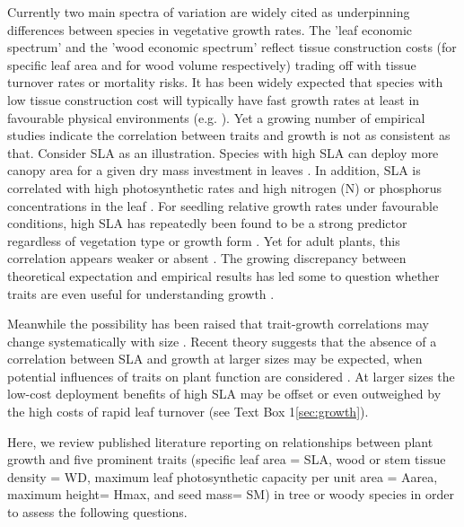 \documentclass[a4paper]{article}\usepackage[]{graphicx}\usepackage[]{color}
\begin{document}
Currently two main spectra of variation are widely cited as underpinning differences between species in vegetative growth rates. The 'leaf economic spectrum' \citep{Wright:2004jb} and the 'wood economic spectrum' \citep{Chave:2009iy} reflect tissue construction costs (for specific leaf area and for wood volume respectively) trading off with tissue turnover rates or mortality risks. It has been widely expected that species with low tissue construction cost will typically have fast growth rates at least in favourable physical environments (e.g. \citealt{MullerLandau:2004dc,Wright:2004jb,Poorter:2008iu,Chave:2009iy,Larjavaara:2010bn,Iida:2012jb,Paine:2015df}). Yet a growing number of empirical studies indicate the correlation between traits and growth is not as consistent as that. Consider SLA as an illustration. Species with high SLA can deploy more canopy area for a given dry mass investment in leaves \citep{Poorter:1999wd, Reich:1992wm}. In addition, SLA is correlated with high photosynthetic rates and high nitrogen (N) or phosphorus concentrations in the leaf \citep{Wright:2004jb}. For seedling relative growth rates under favourable conditions, high SLA has repeatedly been found to be a strong predictor regardless of vegetation type or growth form \citep{Lambers:1992bj,Reich:1992wm,Grime:1997wm,Poorter:1999wd,Wright:1999ds}. Yet for adult plants, this correlation appears weaker or absent \citep{coomes_comparison_1998,Poorter:2008iu,Aiba:2009ft,Easdale:2009gv,Wright:2010tp}. The growing discrepancy between theoretical expectation and empirical results has led some to question whether traits are even useful for understanding growth \citep{Wright:2010tp, Paine:2015df}.

Meanwhile the possibility has been raised that trait-growth correlations may change systematically with size \citep{Enquist:2007ek,Falster:2011ii, Ruger:2012jv, Iida:2014ep, Iida:2014hq}. Recent theory suggests that the absence of a correlation between SLA and growth at larger sizes may be expected, when potential influences of traits on plant function are considered \citep{Falster:2011ii, falster:2013}. At larger sizes the low-cost deployment benefits of high SLA may be offset or even outweighed by the high costs of rapid leaf turnover (see Text Box 1\ref{sec:growth}). 

Here, we review published literature reporting on relationships between plant growth and five prominent traits (specific leaf area = SLA, wood or stem tissue density = WD, maximum leaf photosynthetic capacity per unit area = Aarea,  maximum height= Hmax, and seed mass= SM) in tree or woody species in order to assess the following questions. 
\end{document}
